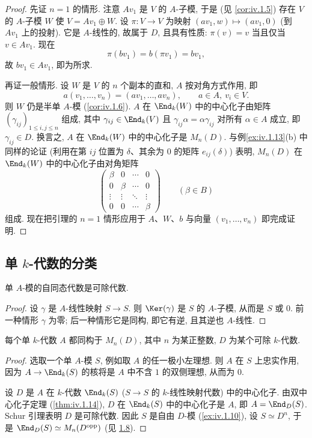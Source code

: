 \begin{proof}
先证 $n=1$ 的情形. 注意 $Av_1$ 是 $V$ 的 $A$-子模, 于是 (见 \ref{cor:iv.1.5}) 存在 $V$ 的 $A$-子模 $W$ 使 $V=Av_1\oplus W$. 设 $\pi\colon V\to V$ 为映射 $(av_1,w)\mapsto(av_1,0)$ (到 $Av_1$ 上的投射). 它是 $A$-线性的, 故属于 $D$, 且具有性质: $\pi(v)=v$ 当且仅当 $v\in Av_1$. 现在
\[
\pi(bv_{1})=b(\pi v_{1})=bv_{1},
\]
故 $bv_1\in Av_1$, 即为所求.

再证一般情形. 设 $W$ 是 $V$ 的 $n$ 个副本的直和, $A$ 按对角方式作用, 即
\[
a(v_{1},\ldots,v_{n})=(av_{1},\ldots,av_{n}),\qquad a\in A,\ v_{i}\in V.
\]
则 $W$ 仍是半单 $A$-模 (\ref{cor:iv.1.6}). $A$ 在 $\End_k(W)$ 中的中心化子由矩阵 $(\gamma_{ij})_{1\le i,j\le n}$ 组成, 其中 $\gamma_{ij}\in\End_k(V)$ 且 $\gamma_{ij}\alpha=\alpha\gamma_{ij}$ 对所有 $\alpha\in A$ 成立, 即 $\gamma_{ij}\in D$. 换言之, $A$ 在 $\End_k(W)$ 中的中心化子是 $M_n(D)$. 与例\ref{ex:iv.1.13}(b) 中同样的论证 (利用在第 $ij$ 位置为 $\delta$、其余为 $0$ 的矩阵 $e_{ij}(\delta)$) 表明, $M_n(D)$ 在 $\End_k(W)$ 中的中心化子由对角矩阵
\[
\begin{pmatrix}\beta&0&\cdots&0\\ 0&\beta&\cdots&0\\ \vdots&\vdots&\ddots&\vdots\\ 0&0&\cdots&\beta\end{pmatrix}
\qquad(\beta\in B)
\]
组成. 现在把引理的 $n=1$ 情形应用于 $A$、$W$、$b$ 与向量 $(v_1,\ldots,v_n)$ 即完成证明.
\end{proof}

\subsection*{单 $k$-代数的分类}

\begin{lemma}[Schur 引理]\label{lem:iv.1.16}
单 $A$-模的自同态代数是可除代数.
\end{lemma}

\begin{proof}
设 $\gamma$ 是 $A$-线性映射 $S\to S$. 则 $\Ker(\gamma)$ 是 $S$ 的 $A$-子模, 从而是 $S$ 或 $0$. 前一种情形 $\gamma$ 为零; 后一种情形它是同构, 即它有逆, 且其逆也 $A$-线性.
\end{proof}

\begin{theorem}\label{thm:iv.1.17}
每个单 $k$-代数 $A$ 都同构于 $M_n(D)$, 其中 $n$ 为某正整数, $D$ 为某个可除 $k$-代数.
\end{theorem}

\begin{proof}
选取一个单 $A$-模 $S$, 例如取 $A$ 的任一极小左理想. 则 $A$ 在 $S$ 上忠实作用, 因为 $A\to\End_k(S)$ 的核将是 $A$ 中不含 $1$ 的双侧理想, 从而为 $0$.

设 $D$ 是 $A$ 在 $k$-代数 $\End_k(S)$ ($S\to S$ 的 $k$-线性映射代数) 中的中心化子. 由双中心化子定理 (\ref{thm:iv.1.14}), $D$ 在 $\End_k(S)$ 中的中心化子是 $A$, 即 $A=\End_D(S)$. Schur 引理表明 $D$ 是可除代数. 因此 $S$ 是自由 $D$-模 (\ref{ex:iv.1.10}), 设 $S\simeq D^n$, 于是 $\End_D(S)\simeq M_n(D^{\mathrm{opp}})$ (见 \hyperlink{item:iv.1.8}{1.8}).
\end{proof}

